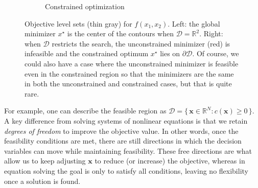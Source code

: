 \begin{figure}[H]
\begin{subfigure}{0.48\textwidth}
    \caption{Constrained optimization}
    \end{subfigure}
    
    \caption{Objective level sets (thin gray) for $f(x_1,x_2)$. Left: the global minimizer $x^\star$ is the center of the contours when $\mathcal{D}=\mathbb{R}^2$. Right: when $\mathcal{D}$ restricts the search, the unconstrained minimizer (red) is infeasible and the constrained optimum $x^\star$ lies on $\partial \mathcal{D}$. Of course, we could also have a case where the unconstrained minimizer is feasible even in the constrained region so that the minimizers are the same in both the unconstrained and constrained cases, but that is quite rare.}
    \label{fig:unconstrained-vs-constrained}
\end{figure}

For example, one can describe the feasible region as $\mathcal{D} = \{\, \mathbf{x} \in \mathbb{R}^N : c(\mathbf{x}) \ge 0 \,\}$. A key difference from solving systems of nonlinear equations is that we retain \emph{degrees of freedom} to improve the objective value. In other words, once the feasibility conditions are met, there are still directions in which the decision variables can move while maintaining feasibility. These free directions are what allow us to keep adjusting $\mathbf{x}$ to reduce (or increase) the objective, whereas in equation solving the goal is only to satisfy all conditions, leaving no flexibility once a solution is found.

